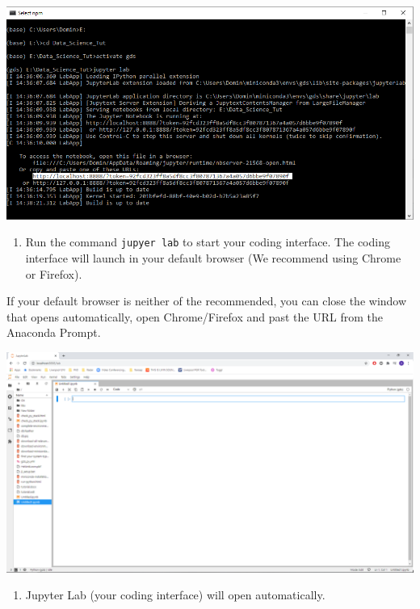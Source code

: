 \documentclass[
]{book}
\providecommand{\tightlist}{%
  \setlength{\itemsep}{0pt}\setlength{\parskip}{0pt}}
\begin{document}
\begin{center}\includegraphics[width=13.58in]{figs/chp4/Conda_13} \end{center}

\begin{enumerate}
\def\labelenumi{\arabic{enumi}.}
\setcounter{enumi}{3}
\tightlist
\item
  Run the command \texttt{jupyer\ lab} to start your coding interface. The coding interface will launch in your default browser (We recommend using Chrome or Firefox).
\end{enumerate}

If your default browser is neither of the recommended, you can close the window that opens automatically, open Chrome/Firefox and past the URL from the Anaconda Prompt.

\begin{center}\includegraphics[width=26.71in]{figs/chp4/Picture24} \end{center}

\begin{enumerate}
\def\labelenumi{\arabic{enumi}.}
\setcounter{enumi}{4}
\tightlist
\item
  Jupyter Lab (your coding interface) will open automatically.
\end{enumerate}
\end{document}

